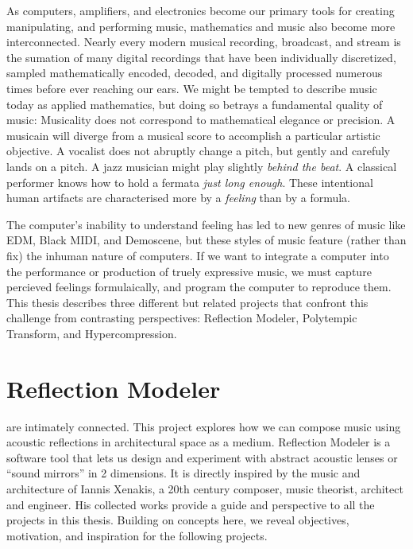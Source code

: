 \documentclass{tufte-book}
\newcommand{\thesis}{Hypercompression\xspace}
\newcommand{\polytempic}{Polytempic Transform\xspace}
\newcommand{\refmod}{Reflection Modeler\xspace}
\begin{document}
As computers, amplifiers, and electronics become our primary tools for
creating manipulating, and performing music, mathematics and music
also become more interconnected. Nearly every modern musical
recording, broadcast, and stream is the sumation of many digital
recordings that have been individually discretized, sampled
mathematically encoded, decoded, and digitally processed numerous
times before ever reaching our ears. We might be tempted to describe
music today as applied mathematics, but doing so betrays a fundamental
quality of music: Musicality does not correspond to mathematical
elegance or precision. A musicain will diverge from a musical score to
accomplish a particular artistic objective. A vocalist does not
abruptly change a pitch, but gently and carefuly lands on a pitch. A
jazz musician might play slightly \emph{behind the beat}. A classical
performer knows how to hold a fermata \emph{just long enough}. These
intentional human artifacts are characterised more by a \emph{feeling}
than by a formula.

The computer's inability to understand feeling has led to new genres
of music like EDM, Black MIDI, and
Demoscene, but these styles of music feature (rather than fix)
the inhuman nature of computers. If we want to integrate a computer
into the performance or production of truely expressive music, we must
capture percieved feelings formulaically, and program the computer to
reproduce them. This thesis describes three different but related
projects that confront this challenge from contrasting perspectives:
\refmod, \polytempic, and \thesis.

\section{\refmod}
\label{sec:refmod-intro}
 are intimately connected. This project
explores how we can compose music using acoustic reflections in
architectural space as a medium. \refmod is a software tool that lets
us design and experiment with abstract acoustic lenses or ``sound
mirrors'' in 2 dimensions. It is directly inspired by the music and
architecture of Iannis Xenakis, a 20th century composer, music
theorist, architect and engineer. His collected works provide a guide
and perspective to all the projects in this thesis. Building on
concepts here, we reveal objectives, motivation, and inspiration for
the following projects.
\end{document}
